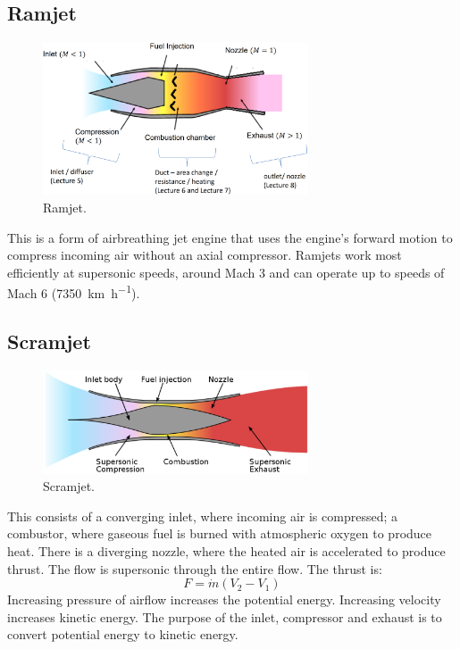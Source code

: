 \documentclass[class=report, crop=false, 12pt,a4paper]{standalone}
\begin{document}
\subsection{Ramjet}
\begin{figure}[H]
    \centering
    \includegraphics[width = 0.7\textwidth]{../img/diagram37.png}
    \caption{Ramjet.}
\end{figure}
This is a form of airbreathing jet engine that uses the engine's forward motion to compress incoming air without an axial compressor. Ramjets work most efficiently at supersonic speeds, around Mach 3 and can operate up to speeds of Mach 6 (\SI{7350}{\kilo\meter\per\hour}).
\subsection{Scramjet}
\begin{figure}[H]
    \centering
    \includegraphics[width = 0.7\textwidth]{../img/diagram44.png}
    \caption{Scramjet.}
\end{figure}
This consists of a converging inlet, where incoming air is compressed; a combustor, where gaseous fuel is burned with atmospheric oxygen to produce heat. There is a diverging nozzle, where the heated air is accelerated to produce thrust. The flow is supersonic through the entire flow. The thrust is:
\begin{equation}
    F = \dot{m}\left(V_2 - V_1\right)
\end{equation}
Increasing pressure of airflow increases the potential energy. Increasing velocity increases kinetic energy. The purpose of the inlet, compressor and exhaust is to convert potential energy to kinetic energy.
\end{document}
